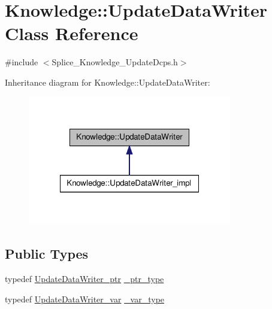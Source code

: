 \hypertarget{classKnowledge_1_1UpdateDataWriter}{
\section{Knowledge::UpdateDataWriter Class Reference}
\label{d9/dbb/classKnowledge_1_1UpdateDataWriter}
}


{\ttfamily \#include $<$Splice\_\-Knowledge\_\-UpdateDcps.h$>$}



Inheritance diagram for Knowledge::UpdateDataWriter:
\nopagebreak
\begin{figure}[H]
\begin{center}
\leavevmode
\includegraphics[width=252pt]{d3/d19/classKnowledge_1_1UpdateDataWriter__inherit__graph}
\end{center}
\end{figure}
\subsection*{Public Types}
\begin{DoxyCompactItemize}
\item 
typedef \hyperlink{classKnowledge_1_1UpdateDataWriter}{UpdateDataWriter\_\-ptr} \hyperlink{classKnowledge_1_1UpdateDataWriter_aa60c888db648c0f608ef197ead80c9a6}{\_\-ptr\_\-type}
\item 
typedef \hyperlink{namespaceKnowledge_a560a08cffb536bdec78ec681bd76c4b5}{UpdateDataWriter\_\-var} \hyperlink{classKnowledge_1_1UpdateDataWriter_a61f476a3f203c6b39a1995c70cf47526}{\_\-var\_\-type}
\end{DoxyCompactItemize}
